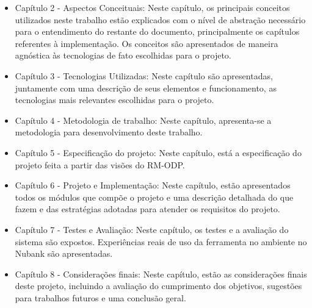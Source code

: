 	\begin{itemize}
      \item Capítulo 2 - Aspectos Conceituais: Neste capítulo, os principais conceitos utilizados neste trabalho estão explicados com o nível de abstração necessário para o entendimento do restante do documento, principalmente os capítulos referentes à implementação. Os conceitos são apresentados de maneira agnóstica às tecnologias de fato escolhidas para o projeto.
      
      \item Capítulo 3 - Tecnologias Utilizadas: Neste capítulo são apresentadas, juntamente com uma descrição de seus elementos e funcionamento, as tecnologias mais relevantes escolhidas para o projeto.
      
      \item Capítulo 4 - Metodologia de trabalho: Neste capítulo, apresenta-se a metodologia para desenvolvimento deste trabalho.
      
      \item Capítulo 5 - Especificação do projeto: Neste capítulo, está a especificação do projeto feita a partir das visões do RM-ODP.
      
      \item Capítulo 6 - Projeto e Implementação: Neste capítulo, estão apresentados todos os módulos que compõe o projeto e uma descrição detalhada do que fazem e das estratégias adotadas para atender os requisitos do projeto.
      
      \item Capítulo 7 - Testes e Avaliação: Neste capítulo, os testes e a avaliação do sistema são expostos. Experiências reais de uso da ferramenta no ambiente no Nubank são apresentadas.
      
      \item Capítulo 8 - Considerações finais: Neste capítulo, estão as considerações finais deste projeto, incluindo a avaliação do cumprimento dos objetivos, sugestões para trabalhos futuros e uma conclusão geral.
    \end{itemize}
	
